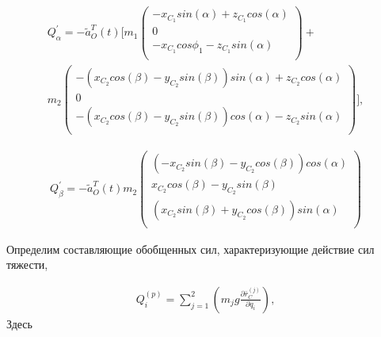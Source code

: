 \begin{equation} %
\label{eq:p3:32}
\begin{multlined}
Q_{ \alpha }^{'}=
-\tilde{a}_{O}^{T} ( t ) 
[ 
m_{1} \left( 
\begin{matrix}
	-x_{C_{1}}sin ( \alpha ) +z_{C_{1}}cos ( \alpha ) \\
	0\\
	-x_{C_{1}}cos \phi _{1}-z_{C_{1}}sin ( \alpha ) \\
\end{matrix}
\right) + \\ 
 m_{2} 
\left( 
\begin{matrix}
	- ( x_{C_{2}}cos ( \beta ) -y_{C_{2}}sin ( \beta ) ) sin ( \alpha ) +z_{C_{2}}cos ( \alpha ) \\
	0 \\
	- ( x_{C_{2}}cos ( \beta ) -y_{C_{2}}sin ( \beta ) ) cos ( \alpha ) -z_{C_{2}}sin ( \alpha ) \\
\end{matrix} 
\right) 
],
\end{multlined}
\end{equation}

\begin{equation} %
\label{eq:p3:33}
\begin{multlined}
Q_{ \beta }^{'}=-\tilde{a}_{O}^{T} \left( t \right) m_{2} \left( \begin{matrix}
\left( -x_{C_{2}}sin \left( \beta \right) -y_{C_{2}}cos \left( \beta \right) \right) cos \left( \alpha \right) \\
x_{C_{2}}cos \left( \beta \right) -y_{C_{2}}sin \left( \beta \right) \\
\left( x_{C_{2}}sin \left( \beta \right) +y_{C_{2}}cos \left( \beta \right) \right) sin \left( \alpha \right) \\
\end{matrix}
\right) 
\end{multlined}
\end{equation}

Определим составляющие обобщенных сил, характеризующие действие сил тяжести, 


\begin{equation} %
\label{eq:p3:34}
\begin{multlined}
Q_{i}^{ \left( p \right) }= \sum _{j=1}^{2} \left( m_{j}g \frac{ \partial \bar{r}_{C}^{ \left( j \right) }}{ \partial q_{i}} \right),
\end{multlined}
\end{equation}
Здесь 


